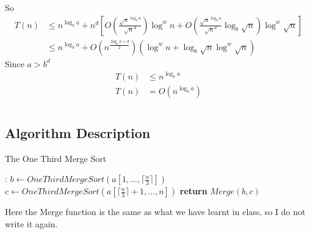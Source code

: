 \documentclass[12pt,letterpaper]{article}
\begin{document}
So
\begin{align}
    T(n)&\leq n^{\log_ba}+n^d\left[O(\frac{\sqrt{n}^{\log_ba}}{\sqrt{n}^{d}})\log^wn+O(\frac{\sqrt{n}^{\log_ba}}{\sqrt{n}^{d}}\log_b\sqrt{n})\log^w\sqrt{n}\right]\\
    &\leq n^{\log_ba}+O(n^{\frac{\log_ba+d}{2}})\left(\log^wn+\log_b\sqrt{n}\log^w\sqrt{n}\right)
\end{align}
Since $a>b^d$
\begin{align}
    T(n)&\leq n^{\log_ba} \\
    T(n)&=O(n^{\log_ba})
\end{align}
\section{}
\subsection{Algorithm Description}
\begin{algorithm}
    \caption{The One Third Merge Sort}\label{alg:13merge}
    \begin{algorithmic}[1]
    :
    \EndIf
    \State $b\gets OneThirdMergeSort(a[1,\dots,\lceil\frac{n}{3}\rceil])$
    \State $c\gets OneThirdMergeSort(a[\lceil\frac{n}{3}\rceil+1,\dots,n])$
    \State \textbf{return} $Merge(b,c)$
    \EndProcedure
    \end{algorithmic}
\end{algorithm}
Here the Merge function is the same as what we have learnt in class, so I do not write it again.
\end{document}
